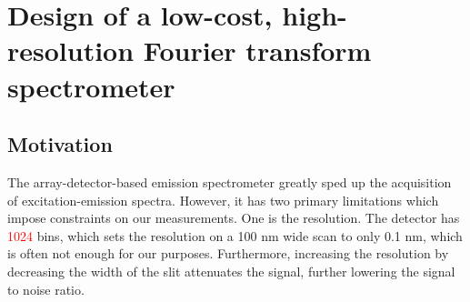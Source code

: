 \documentclass[12pt]{puthesis}
\newcommand{\notetoself}[1]{\textcolor{red}{#1}}
\begin{document}




\chapter{Design of a low-cost, high-resolution Fourier transform spectrometer}

\section{Motivation}

The array-detector-based emission spectrometer greatly sped up the acquisition of excitation-emission spectra. However, it has two primary limitations which impose constraints on our measurements. One is the resolution. The detector has \notetoself{1024} bins, which sets the resolution on a 100 nm wide scan to only 0.1 nm, which is often not enough for our purposes. Furthermore, increasing the resolution by decreasing the width of the slit attenuates the signal, further lowering the signal to noise ratio.
\end{document}
